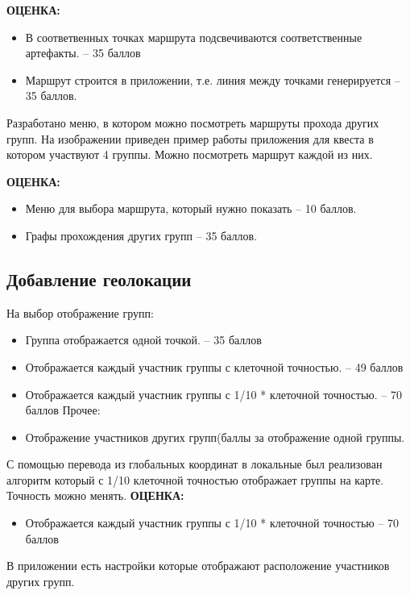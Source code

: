  
\textbf{ОЦЕНКА:}
\begin{itemize}
    \item	В соответвенных точках маршрута подсвечиваются соответственные 
артефакты. – 35 баллов
    \item	Маршрут строится в приложении, т.е. линия между точками 
генерируется – 35 баллов.
\end{itemize}

Разработано меню, в котором можно посмотреть маршруты прохода других групп. На изображении приведен пример работы приложения для квеста в котором участвуют 4 группы. Можно посмотреть маршрут каждой из них.


\textbf{ОЦЕНКА:}
\begin{itemize}
    \item	Меню для выбора маршрута, который нужно показать – 10 баллов.
    \item	Графы прохождения других групп – 35 баллов.
\end{itemize}

\subsection*{Добавление геолокации}

\markSection
На выбор отображение групп:
    \begin{itemize}
        \item	Группа отображается одной точкой.  – 35 баллов
        \item	Отображается каждый участник группы с клеточной точностью. – 49 баллов
        \item	Отображается каждый участник группы с 1/10 * клеточной точностью. – 70 баллов
    Прочее:
        \item	Отображение участников других групп(баллы за отображение одной группы.
    \end{itemize}
\solutionSection
С помощью перевода из глобальных координат в локальные был реализован алгоритм который с 1/10 клеточной точностью отображает группы на карте. Точность можно менять. 
\textbf{ОЦЕНКА:}
\begin{itemize}
    \item Отображается каждый участник группы с 1/10 * клеточной точностью – 70 баллов
\end{itemize}
В приложении есть настройки которые отображают расположение участников других групп.
